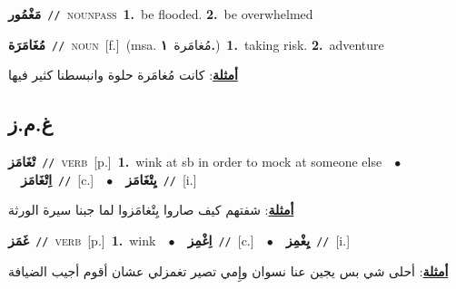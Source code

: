 \documentclass[10pt,a4paper,twoside]{article} %
\begin{document}
\begin{multicols}{2}
{\setlength\topsep{0pt}\textbf{\foreignlanguage{arabic}{مَغْمُور}}\ {\color{gray}\texttt{//}\color{black}}\ \textsc{noun\textunderscore pass}\ \textbf{1.}~be flooded.  \textbf{2.}~be overwhelmed\ } \vspace{2mm}

{\setlength\topsep{0pt}\textbf{\foreignlanguage{arabic}{مُغَامَرَة}}\ {\color{gray}\texttt{//}\color{black}}\ \textsc{noun}\ [f.]\ \color{gray}(msa. \foreignlanguage{arabic}{مُغامَرة}~\foreignlanguage{arabic}{\textbf{١.}})\color{black}\ \textbf{1.}~taking risk.  \textbf{2.}~adventure\  \begin{flushright}\color{gray}\foreignlanguage{arabic}{\textbf{\underline{\foreignlanguage{arabic}{أمثلة}}}: كانت مُغامَرة حلوة وانبسطنا كثير فيها}\end{flushright}\color{black}} \vspace{2mm}

\vspace{-3mm}
\subsection*{\color{blue}\foreignlanguage{arabic}{غ.م.ز}\color{blue}{}} 

{\setlength\topsep{0pt}\textbf{\foreignlanguage{arabic}{تْغَامَز}}\ {\color{gray}\texttt{//}\color{black}}\ \textsc{verb}\ [p.]\ \textbf{1.}~wink at sb in order to mock at someone else\ \ $\bullet$\ \ \setlength\topsep{0pt}\textbf{\foreignlanguage{arabic}{اِتْغَامَز}}\ {\color{gray}\texttt{//}\color{black}}\ [c.]\ \ $\bullet$\ \ \setlength\topsep{0pt}\textbf{\foreignlanguage{arabic}{يِتْغَامَز}}\ {\color{gray}\texttt{//}\color{black}}\ [i.]\  \begin{flushright}\color{gray}\foreignlanguage{arabic}{\textbf{\underline{\foreignlanguage{arabic}{أمثلة}}}: شفتهم كيف صاروا يِتْغامَزوا لما جبنا سيرة الورثة}\end{flushright}\color{black}} \vspace{2mm}

{\setlength\topsep{0pt}\textbf{\foreignlanguage{arabic}{غَمَز}}\ {\color{gray}\texttt{//}\color{black}}\ \textsc{verb}\ [p.]\ \textbf{1.}~wink\ \ $\bullet$\ \ \setlength\topsep{0pt}\textbf{\foreignlanguage{arabic}{اِغْمِز}}\ {\color{gray}\texttt{//}\color{black}}\ [c.]\ \ $\bullet$\ \ \setlength\topsep{0pt}\textbf{\foreignlanguage{arabic}{يِغْمِز}}\ {\color{gray}\texttt{//}\color{black}}\ [i.]\  \begin{flushright}\color{gray}\foreignlanguage{arabic}{\textbf{\underline{\foreignlanguage{arabic}{أمثلة}}}: أحلى شي بس يجين عنا نسوان وإِمي تصير تغمزلي عشان أقوم أجيب الضيافة}\end{flushright}\color{black}} \vspace{2mm}


\end{multicols}
\end{document}
